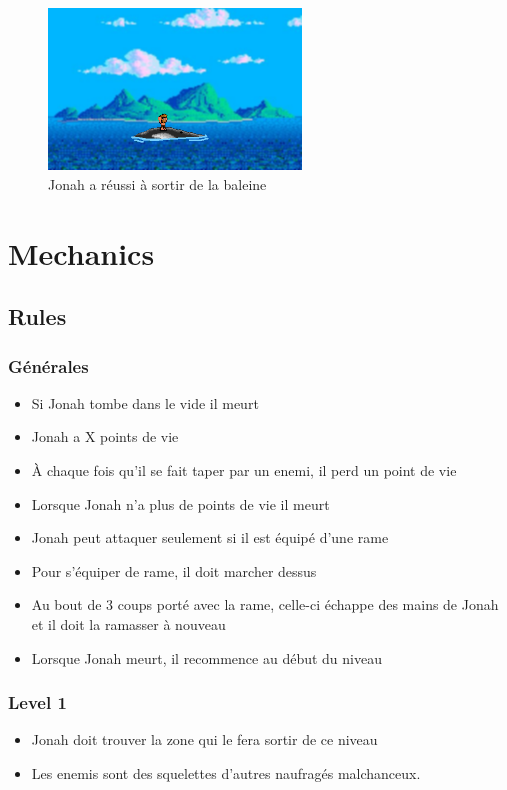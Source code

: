 \documentclass{prologArticle}
\begin{document}
\begin{figure}[H]
    \centering
    \includegraphics[width=0.6\textwidth]{res/story3.png}
    \caption{Jonah a réussi à sortir de la baleine}
\end{figure}

\section{Mechanics}

\subsection{Rules}

\subsubsection{Générales}
\begin{itemize}
    \item Si Jonah tombe dans le vide il meurt
    \item Jonah a X points de vie %
    \item À chaque fois qu'il se fait taper par un enemi, il perd un point de vie
    \item Lorsque Jonah n'a plus de points de vie il meurt
    \item Jonah peut attaquer seulement si il est équipé d'une rame
    \item Pour s'équiper de rame, il doit marcher dessus
    \item Au bout de 3 coups porté avec la rame, celle-ci échappe des mains de Jonah et il doit la ramasser à nouveau
    \item Lorsque Jonah meurt, il recommence au début du niveau
\end{itemize}

\subsubsection{Level 1}
\begin{itemize}
    \item Jonah doit trouver la zone qui le fera sortir de ce niveau
    \item Les enemis sont des squelettes d'autres naufragés malchanceux.
\end{itemize}
\end{document}
